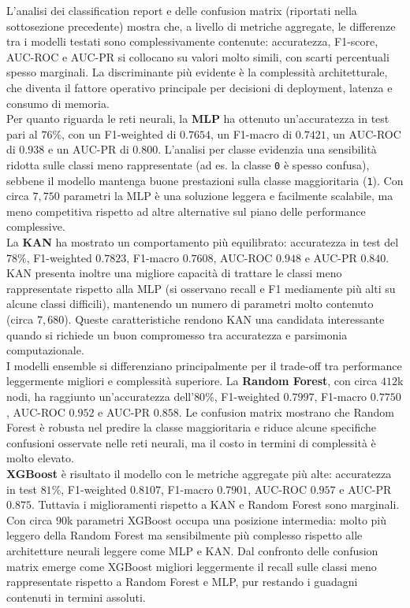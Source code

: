 \documentclass[a4paper,12pt]{report}
\begin{document}
	L'analisi dei classification report e delle confusion matrix (riportati nella sottosezione precedente) mostra che, a livello di metriche aggregate, le differenze tra i modelli testati sono complessivamente contenute: accuratezza, F1-score, AUC-ROC e AUC-PR si collocano su valori molto simili, con scarti percentuali spesso marginali. La discriminante più evidente è la complessità architetturale, che diventa il fattore operativo principale per decisioni di deployment, latenza e consumo di memoria. \\ 
	Per quanto riguarda le reti neurali, la \textbf{MLP} ha ottenuto un'accuratezza in test pari al $76\%$, con un F1-weighted di $0.7654$, un F1-macro di $0.7421$, un AUC-ROC di $0.938$ e un AUC-PR di $0.800$. L'analisi per classe evidenzia una sensibilità ridotta sulle classi meno rappresentate (ad es. la classe \texttt{0} è spesso confusa), sebbene il modello mantenga buone prestazioni sulla classe maggioritaria (\texttt{1}). Con circa $7{,}750$ parametri la MLP è una soluzione leggera e facilmente scalabile, ma meno competitiva rispetto ad altre alternative sul piano delle performance complessive. \\ 
	La \textbf{KAN} ha mostrato un comportamento più equilibrato: accuratezza in test del $78\%$, F1-weighted $0.7823$, F1-macro $0.7608$, AUC-ROC $0.948$ e AUC-PR $0.840$. KAN presenta inoltre una migliore capacità di trattare le classi meno rappresentate rispetto alla MLP (si osservano recall e F1 mediamente più alti su alcune classi difficili), mantenendo un numero di parametri molto contenuto (circa $7{,}680$). Queste caratteristiche rendono KAN una candidata interessante quando si richiede un buon compromesso tra accuratezza e parsimonia computazionale. \\ 
	I modelli ensemble si differenziano principalmente per il trade-off tra performance leggermente migliori e complessità superiore. La \textbf{Random Forest}, con circa $412$k nodi, ha raggiunto un'accuratezza dell'$80\%$, F1-weighted $0.7997$, F1-macro $0.7750$, AUC-ROC $0.952$ e AUC-PR $0.858$. Le confusion matrix mostrano che Random Forest è robusta nel predire la classe maggioritaria e riduce alcune specifiche confusioni osservate nelle reti neurali, ma il costo in termini di complessità è molto elevato. \\ 
	\textbf{XGBoost} è risultato il modello con le metriche aggregate più alte: accuratezza in test $81\%$, F1-weighted $0.8107$, F1-macro $0.7901$, AUC-ROC $0.957$ e AUC-PR $0.875$. Tuttavia i miglioramenti rispetto a KAN e Random Forest sono marginali. Con circa $90$k parametri XGBoost occupa una posizione intermedia: molto più leggero della Random Forest ma sensibilmente più complesso rispetto alle architetture neurali leggere come MLP e KAN. Dal confronto delle confusion matrix emerge come XGBoost migliori leggermente il recall sulle classi meno rappresentate rispetto a Random Forest e MLP, pur restando i guadagni contenuti in termini assoluti. \\
\end{document}
